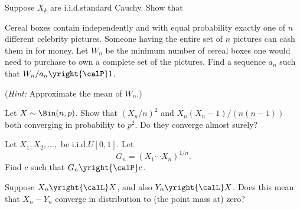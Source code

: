 \begin{problem}[DasGupta 7.14 (a)]
  Suppose \(X_k\) are i.i.d.\@ standard Cauchy. Show that
\end{problem}
\begin{solution}

\end{solution}
\newpage

\begin{problem}
  Cereal boxes contain independently and with equal probability exactly one
  of \(n\) different celebrity pictures. Someone having the entire set of
  \(n\) pictures can cash them in for money. Let \(W_n\) be the minimum
  number of cereal boxes one would need to purchase to own a complete set
  of the pictures. Find a sequence \(a_n\) such that
  \(W_n/a_n\yright{\calP} 1\).

  \noindent (\emph{Hint:} Approximate the mean of \(W_n\).)
\end{problem}
\begin{solution}

\end{solution}
\newpage

\begin{problem}[DasGupta 7.17]
  Let \(X\sim\Bin(n,p)\). Show that \((X_n/n)^2\) and
  \(X_n(X_n-1)/(n(n-1))\) both converging in probability to \(p^2\). Do
  they converge almost surely?
\end{problem}
\begin{solution}

\end{solution}
\newpage

\begin{problem}[DasGupta 7.21]
  Let \(X_1,X_2,\dotsc,\) be i.i.d.\@ \(U[0,1]\). Let
  \[
    G_n=(X_1\dotsm X_n)^{1/n}.
  \]
  Find \(c\) such that \(G_n\yright{\calP} c\).
\end{problem}
\begin{solution}

\end{solution}
\newpage

\begin{problem}
  Suppose \(X_n\yright{\calL}X\), and also \(Y_n\yright{\calL} X\). Does
  this mean that \(X_n-Y_n\) converge in distribution to (the point mass
  at) zero?
\end{problem}
\begin{solution}

\end{solution}
\newpage

